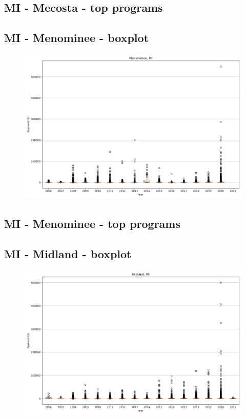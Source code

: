 \subsection*{MI - Mecosta - top programs}

\newpage
\subsection*{MI - Menominee - boxplot}
\begin{figure}[h]
\centering
\includegraphics[width=7in]{../output/boxplots/counties/Menominee-MI_boxplot.png}
\end{figure}


\subsection*{MI - Menominee - top programs}

\newpage
\subsection*{MI - Midland - boxplot}
\begin{figure}[h]
\centering
\includegraphics[width=7in]{../output/boxplots/counties/Midland-MI_boxplot.png}
\end{figure}


